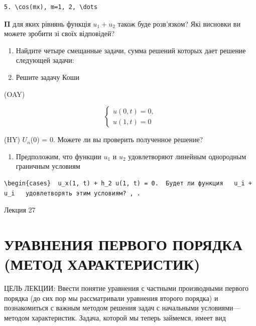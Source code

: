\documentclass[
  ukrainian,
]{article}
\providecommand{\tightlist}{%
  \setlength{\itemsep}{0pt}\setlength{\parskip}{0pt}}
\begin{document}
\begin{verbatim}
5. \cos(mx), m=1, 2, \dots
\end{verbatim}

\(\mathbf{\Pi}\) для яких рівнянь функція \(u_1 + u_2\) також буде
розв'язком? Які висновки ви можете зробити зі своїх відповідей?

\begin{enumerate}
\def\labelenumi{\arabic{enumi}.}
\setcounter{enumi}{3}
\item
  Найдите четыре смещанные задачи, сумма решений которых дает решение
  следующей задачи:
\item
  Решите задачу Коши
\end{enumerate}

(OAY)

\[
\begin{cases} u(0, t) = 0, \\ u(1, t) = 0 \end{cases}
\]

(HY) \(U_n\)(0) = 0. Можете ли вы проверить полученное решение?

\begin{enumerate}
\def\labelenumi{\arabic{enumi}.}
\setcounter{enumi}{5}
\tightlist
\item
  Предположим, что функции \(u_1\) и \(u_2\) удовлетворяют линейным
  однородным граничным условиям
\end{enumerate}

\begin{verbatim}
\begin{cases}  u_x(1, t) + h_2 u(1, t) = 0.  Будет ли функция   u_i + u_i   удовлетворять этим условиям? , .
\end{verbatim}

Лекция 27

\section{УРАВНЕНИЯ ПЕРВОГО ПОРЯДКА (МЕТОД
ХАРАКТЕРИСТИК)}\label{ux443ux440ux430ux432ux43dux435ux43dux438ux44f-ux43fux435ux440ux432ux43eux433ux43e-ux43fux43eux440ux44fux434ux43aux430-ux43cux435ux442ux43eux434-ux445ux430ux440ux430ux43aux442ux435ux440ux438ux441ux442ux438ux43a}

ЦЕЛЬ ЛЕКЦИИ: Ввести понятие уравнения с частными производными первого
порядка (до сих пор мы рассматривали уравнения второго порядка) и
познакомиться с важным методом решения задач с начальными
условиями---методом характеристик. Задача, которой мы теперь займемся,
имеет вид
\end{document}
